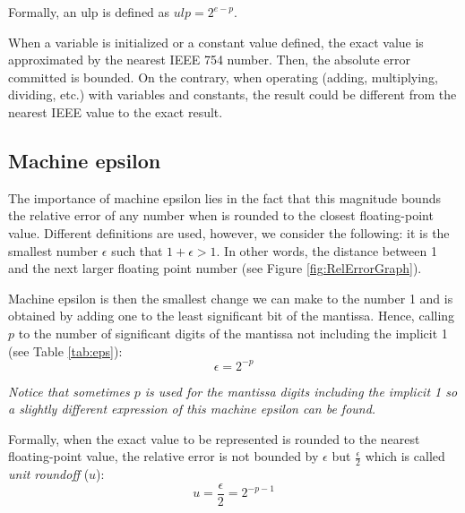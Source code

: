 Formally, an ulp is defined as $ulp = 2^{e-p}$.


When a variable is initialized or a constant value defined, the exact value is approximated by the nearest IEEE 754 number. Then,
the absolute error committed is bounded. 
On the contrary, when operating (adding, multiplying, dividing, etc.) with variables and constants, the result could be different from the nearest IEEE value to the exact result. 





        \FloatBarrier
        \subsection{Machine epsilon}

The importance of machine epsilon lies in the fact that this magnitude bounds the 
relative error of any number when is rounded to the closest floating-point value. 
Different definitions are used, however, we consider the following: 
it is the smallest number $\epsilon$ such that $1 + \epsilon > 1$. 
In other words, the distance between 1 and the next larger floating point number (see Figure \ref{fig:RelErrorGraph}).

Machine epsilon is then the smallest change we can make to the number 1 and is obtained by adding one to the least significant bit of the mantissa. 
Hence, calling $p$ to the number of significant digits of the mantissa not including the implicit 1 (see Table \ref{tab:eps}):
$$
\epsilon = 2^{-p}
$$ 

\textit{Notice that sometimes $p$ is used for the mantissa digits including the implicit 1 so a slightly different expression of this machine epsilon can be found.}

Formally, when the exact value to be represented is rounded to the nearest floating-point value, 
the relative error is not bounded by $\epsilon$ but $\frac{\epsilon}{2}$ which is called \textit{unit roundoff} ($u$):
$$
u = \frac{\epsilon}{2} = 2^{-p-1}
$$


